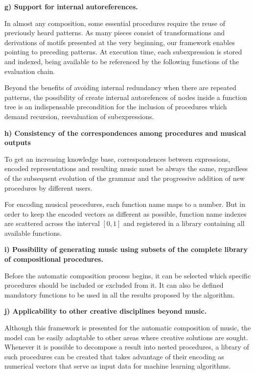 \documentclass{article}
\begin{document}
\textbf{g) Support for internal autoreferences.}

In almost any composition, some essential procedures require the reuse of   previously heard patterns. As many pieces consist of transformations and derivations of motifs presented at the very beginning, our framework enables pointing to preceding patterns. At execution time, each subexpression is stored and indexed, being available to be referenced by the following functions of the evaluation chain.

Beyond the benefits of avoiding internal redundancy when there are repeated patterns, the possibility of create internal autorefences of nodes inside a function tree is an indispensable precondition for the inclusion of procedures which demand recursion, reevaluation of subexpressions.


\textbf{h) Consistency of the correspondences among procedures and musical outputs}

To get an increasing knowledge base, correspondences between expressions, encoded representations and resulting music must be always the same, regardless of the subsequent evolution of the grammar and the progressive addition of new procedures by different users.

For encoding musical procedures, each function name maps to a number. But in order to keep the encoded vectors as different as possible, function name indexes are scattered across the interval $[0, 1]$ and registered in a library containing all available functions.


\textbf{i) Possibility of generating music using subsets of the complete library of compositional procedures.}

Before the automatic composition process begins, it can be selected which specific procedures should be included or excluded from it. It can also be defined mandatory functions to be used in all the results proposed by the algorithm.

\textbf{j) Applicability to other creative disciplines beyond music.}

Although this framework is presented for the automatic composition of music, the model can be easily adaptable to other areas where creative solutions are sought. Whenever it is possible to decompose a result into nested procedures, a library of such procedures can be created that takes advantage of their encoding as numerical vectors that serve as input data for machine learning algorithms.
\end{document}
